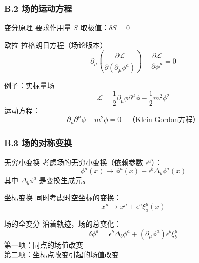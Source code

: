 \documentclass[xcolor=dvipsnames]{ctexbeamer}
\begin{document}
\begin{frame}
\frametitle{B.2 场的运动方程}
\begin{block}{变分原理}
要求作用量 $S$ 取极值：$\delta S = 0$
\end{block}

\pause

\begin{block}{欧拉-拉格朗日方程（场论版本）}
$$\boxed{\partial_\mu\left(\frac{\partial \mathcal{L}}{\partial(\partial_\mu\phi^a)}\right) - \frac{\partial \mathcal{L}}{\partial \phi^a} = 0}$$
\end{block}

\pause

\begin{block}{例子：实标量场}
$$\mathcal{L} = \frac{1}{2}\partial_\mu\phi\partial^\mu\phi - \frac{1}{2}m^2\phi^2$$
运动方程：
$$\partial_\mu\partial^\mu\phi + m^2\phi = 0 \quad \text{（Klein-Gordon方程）}$$
\end{block}
\end{frame}

\begin{frame}
\frametitle{B.3 场的对称变换}
\begin{block}{无穷小变换}
考虑场的无穷小变换（依赖参数 $\epsilon^a$）：
$$\phi^a(x) \to \phi^a(x) + \epsilon^b \Delta_b\phi^a(x)$$
其中 $\Delta_b\phi^a$ 是变换生成元。
\end{block}

\pause

\begin{block}{坐标变换}
同时考虑时空坐标的变换：
$$x^\mu \to x^\mu + \epsilon^a \xi^\mu_a(x)$$
\end{block}

\pause

\begin{block}{场的全变分}
沿着轨迹，场的总变化：
$$\delta\phi^a = \epsilon^b\Delta_b\phi^a + (\partial_\mu\phi^a)\epsilon^b\xi^\mu_b$$
第一项：同点的场值改变 \\
第二项：坐标点改变引起的场值改变
\end{block}
\end{frame}
\end{document}
